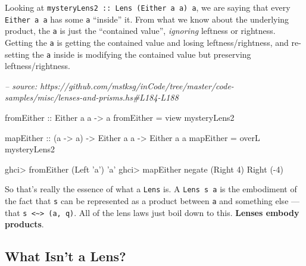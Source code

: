 \documentclass[]{article}
\newenvironment{Shaded}{}{}
\newcommand{\CharTok}[1]{\textcolor[rgb]{0.25,0.44,0.63}{#1}}
\newcommand{\CommentTok}[1]{\textcolor[rgb]{0.38,0.63,0.69}{\textit{#1}}}
\newcommand{\DataTypeTok}[1]{\textcolor[rgb]{0.56,0.13,0.00}{#1}}
\newcommand{\DecValTok}[1]{\textcolor[rgb]{0.25,0.63,0.44}{#1}}
\newcommand{\FunctionTok}[1]{\textcolor[rgb]{0.02,0.16,0.49}{#1}}
\newcommand{\NormalTok}[1]{#1}
\newcommand{\OtherTok}[1]{\textcolor[rgb]{0.00,0.44,0.13}{#1}}
\begin{document}
Looking at \texttt{mysteryLens2\ ::\ Lens\textquotesingle{}\ (Either\ a\ a)\ a},
we are saying that every \texttt{Either\ a\ a} has some \texttt{a} ``inside''
it. From what we know about the underlying product, the \texttt{a} is just the
``contained value'', \emph{ignoring} leftness or rightness. Getting the
\texttt{a} is getting the contained value and losing leftness/rightness, and
re-setting the \texttt{a} inside is modifying the contained value but preserving
leftness/rightness.

\begin{Shaded}
\begin{Highlighting}[]
\CommentTok{-- source: https://github.com/mstksg/inCode/tree/master/code-samples/misc/lenses-and-prisms.hs#L184-L188}

\OtherTok{fromEither ::} \DataTypeTok{Either}\NormalTok{ a a }\OtherTok{->}\NormalTok{ a}
\NormalTok{fromEither }\FunctionTok{=}\NormalTok{ view mysteryLens2}

\OtherTok{mapEither ::}\NormalTok{ (a }\OtherTok{->}\NormalTok{ a) }\OtherTok{->} \DataTypeTok{Either}\NormalTok{ a a }\OtherTok{->} \DataTypeTok{Either}\NormalTok{ a a}
\NormalTok{mapEither }\FunctionTok{=}\NormalTok{ overL mysteryLens2}
\end{Highlighting}
\end{Shaded}

\begin{Shaded}
\begin{Highlighting}[]
\NormalTok{ghci}\FunctionTok{>}\NormalTok{ fromEither (}\DataTypeTok{Left} \CharTok{'a'}\NormalTok{)}
\CharTok{'a'}
\NormalTok{ghci}\FunctionTok{>}\NormalTok{ mapEither negate (}\DataTypeTok{Right} \DecValTok{4}\NormalTok{)}
\DataTypeTok{Right}\NormalTok{ (}\FunctionTok{-}\DecValTok{4}\NormalTok{)}
\end{Highlighting}
\end{Shaded}

So that's really the essence of what a \texttt{Lens\textquotesingle{}} is. A
\texttt{Lens\textquotesingle{}\ s\ a} is the embodiment of the fact that
\texttt{s} can be represented as a product between \texttt{a} and something else
--- that \texttt{s\ \textless{}\textasciitilde{}\textgreater{}\ (a,\ q)}. All of
the lens laws just boil down to this. \textbf{Lenses embody products}.

\hypertarget{what-isnt-a-lens}{%
\subsection{What Isn't a Lens?}\label{what-isnt-a-lens}}
\end{document}
